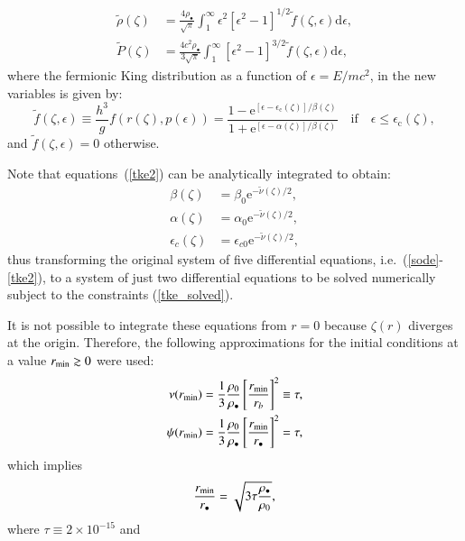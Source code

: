 \documentclass[twocolumn]{aa}
\begin{document}
\begin{appendix}
\begin{align}
    \tilde{\rho}(\zeta)&=\frac{4\rho_{\bullet}}{\sqrt{\pi}}\int^\infty_1\epsilon^2[\epsilon^2-1]^{1/2}\tilde{f}(\zeta,\epsilon)\mathrm{d}\epsilon,\\
   \tilde{P}(\zeta)&=\frac{4c^2\rho_{\bullet}}{3\sqrt{\pi}}\int^\infty_1[\epsilon^2-1]^{3/2}\tilde{f}(\zeta,\epsilon)\mathrm{d}\epsilon,
\end{align}
where the fermionic King distribution as a function of
$\epsilon=E/mc^2$, in the new variables is given by:
\begin{equation}
\tilde{f}(\zeta,\epsilon)\equiv \frac{h^3}{g}f(r(\zeta),p(\epsilon))=
      \frac{1-\mathrm {e}^{[\epsilon-\epsilon_\mathrm{c}(\zeta)]/\beta(\zeta)}}
      {1+\mathrm {e}^{[\epsilon-\alpha(\zeta)]/\beta(\zeta)}}\quad\mathrm{if}\quad \epsilon \leq \epsilon_\mathrm{c}(\zeta),
\end{equation}
and $\tilde{f}(\zeta,\epsilon) = 0$ otherwise.

Note that equations~(\ref{tke2}) can be analytically integrated to obtain:
\begin{align}
 \beta(\zeta) &= \beta_0\mathrm{e}^{-\tilde{\nu}(\zeta)/2}, \nonumber\\
 \alpha(\zeta) &= \alpha_0\mathrm{e}^{-\tilde{\nu}(\zeta)/2}, \nonumber\\
 \epsilon_c(\zeta) &= \epsilon_{c0}\mathrm{e}^{-\tilde{\nu}(\zeta)/2},
 \label{tke_solved}
\end{align}
thus transforming the original system of five differential equations, i.e.~(\ref{sode}-\ref{tke2}), to a system of just two differential equations to be solved numerically subject to the constraints (\ref{tke_solved}).

It is not possible to integrate these equations from $r=0$ because $\zeta(r)$ diverges at the origin.
Therefore, the following approximations for the initial conditions at a value $r_{\rm{min}}\gtrsim 0$ were used:
\begin{align}
   \nu(r_{\rm{min}}) &= \frac{1}{3}\frac{\rho_0}{\rho_\bullet}\left[\frac{r_{\rm{min}}}{r_b}\right]^2\equiv \tau, \\
   \psi(r_{\rm{min}})&= \frac{1}{3}\frac{\rho_0}{\rho_\bullet}\left[\frac{r_{\rm{min}}}{r_\bullet}\right]^2 = \tau,
\end{align}
which implies
\begin{equation}
   \frac{r_{\rm{min}}}{r_\bullet}=\sqrt{3\tau\frac{\rho_\bullet}{\rho_0}},
\end{equation}
where
$\tau\equiv 2\times10^{-15}$ and


\end{appendix}
\end{document}
